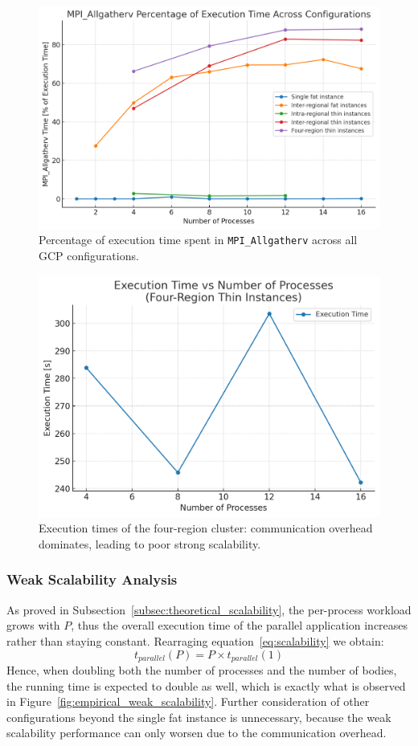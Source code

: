 \documentclass{article}
\begin{document}
\begin{figure}[H]
\centering
\includegraphics[width=0.8\linewidth]{communication_fraction_ex_time.png}
\caption{Percentage of execution time spent in \texttt{MPI\_Allgatherv} across all GCP configurations.}
\label{fig:comparison_fraction_communication}
\end{figure}

\begin{figure}[H]
\centering
\includegraphics[width=0.8\linewidth]{four_region_ex_time.png}
\caption{Execution times of the four-region cluster: communication overhead dominates, leading to poor strong scalability.}
\label{fig:four_region_ex_time}
\end{figure}

\subsubsection{Weak Scalability Analysis}
As proved in Subsection~\ref{subsec:theoretical_scalability}, the per-process workload grows with $P$, thus the overall execution time of the parallel application increases rather than staying constant.
Rearraging equation~\ref{eq:scalability} we obtain:
\begin{equation}
t_{parallel}(P) = P\times t_{parallel}(1)
\end{equation}
Hence, when doubling both the number of processes and the number of bodies, the running time is expected to double as well, which is exactly what is observed in Figure~\ref{fig:empirical_weak_scalability}.
Further consideration of other configurations beyond the single fat instance is unnecessary, because the weak scalability performance can only worsen due to the communication overhead.
\end{document}
